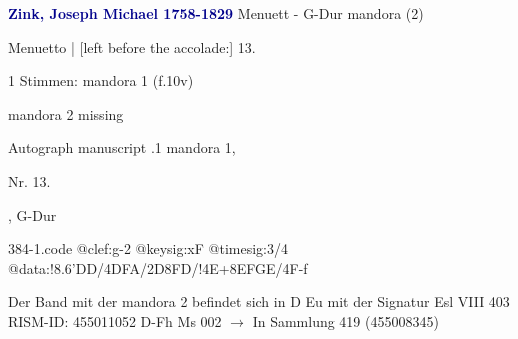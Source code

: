 \documentclass[twocolumn]{book}
\begin{document}
\newline \par \vspace{7pt} \textcolor{darkblue}{\textbf{Zink, Joseph Michael  1758-1829}}
\newline Menuett - G-Dur
\newline mandora (2)
\newline \begin{itshape}[f.10v, at left:] Menuetto | [left before the accolade:] 13.\end{itshape} 
\newline \textcolor{darkblue}{}  1 Stimmen: mandora 1  (f.10v)
\newline \begin{small} mandora 2 missing\end{small} 
\newline Autograph manuscript
.1  mandora 1, \begin{itshape}Nr. 13.\end{itshape}, G-Dur  
\begin{filecontents*}{384-1.code}
@clef:g-2
@keysig:xF
@timesig:3/4
@data:!{8.6'DD}/4DFA/2D{8FD}/!4E+{8EFGE}/4F-f
\end{filecontents*}
\newline
%
\newline Der Band mit der mandora 2 befindet sich in D Eu mit der Signatur Esl VIII 403
\newline RISM-ID: 455011052
\newline D-Fh  Ms 002
\newline $\rightarrow$ In Sammlung 419 (455008345)
      
\end{document}
